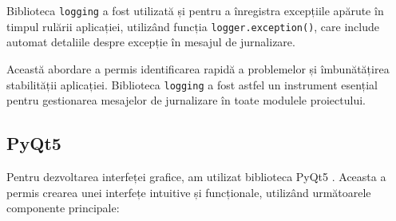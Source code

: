 \documentclass[12pt,a4paper]{article}
\begin{document}
Biblioteca \texttt{logging} a fost utilizată și pentru a înregistra excepțiile apărute în timpul rulării aplicației, utilizând funcția \texttt{logger.exception()}, care include automat detaliile despre excepție în mesajul de jurnalizare.

Această abordare a permis identificarea rapidă a problemelor și îmbunătățirea stabilității aplicației. Biblioteca \texttt{logging} a fost astfel un instrument esențial pentru gestionarea mesajelor de jurnalizare în toate modulele proiectului.

\subsection{PyQt5}
Pentru dezvoltarea interfeței grafice, am utilizat biblioteca PyQt5 \cite{pyqt5}. Aceasta a permis crearea unei interfețe intuitive și funcționale, utilizând următoarele componente principale:
\end{document}
